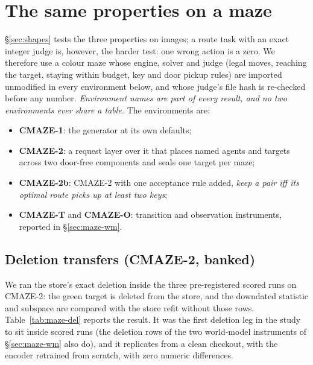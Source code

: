 \documentclass{article} %
\begin{document}
\section{The same properties on a maze}
\label{sec:maze}

\S\ref{sec:shapes} tests the three properties on images; a route task with an exact integer judge is, however, the harder test: one wrong action is a zero. We therefore use a colour maze whose engine, solver and judge (legal
moves, reaching the target, staying within budget, key and door pickup rules) are imported
unmodified in every environment below, and whose judge's file hash is re-checked before any
number. %
\emph{Environment names are part of every result, and no two environments ever share a
table.} The environments are:
\begin{itemize}[leftmargin=*,nosep]
\item \textbf{CMAZE-1}: the generator at its own defaults;
\item \textbf{CMAZE-2}: a request layer over it that places named agents and targets across two
  door-free components and seals one target per maze;
\item \textbf{CMAZE-2b}: CMAZE-2 with one acceptance rule added, \emph{keep a pair iff its
  optimal route picks up at least two keys};
\item \textbf{CMAZE-T} and \textbf{CMAZE-O}: transition and observation instruments, reported in \S\ref{sec:maze-wm}.
\end{itemize}

\subsection{Deletion transfers (CMAZE-2, banked)}
\label{sec:maze-del}

We ran the store's exact deletion inside the three pre-registered scored runs on CMAZE-2: the
green target is deleted from the store, and the downdated statistic and subspace are compared
with the store refit without those rows. Table~\ref{tab:maze-del} reports the result. It was the
first deletion leg in the study to sit inside scored runs (the deletion rows of the two
world-model instruments of \S\ref{sec:maze-wm} also do), and it replicates from a clean
checkout, with the encoder retrained from scratch, with zero numeric differences.
\end{document}
